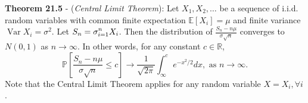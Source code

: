\documentclass{article}
\theoremstyle{definition}
\DeclareMathOperator{\Var}{Var}
\begin{document}
\textbf{Theorem 21.5} - (\textit{Central Limit Theorem}): Let $X_1, X_2, \dots$ be a sequence of i.i.d. random variables with common finite expectation $\mathbb{E}[X_i] = \mu$ and finite variance $\Var{X_i} = \sigma^2$. Let $S_n = \mathlarger{\sigma_{i = 1}^n} X_i$. Then the distribution of $\frac{S_n - n \mu}{\sigma \sqrt{n}}$ converges to $N(0, 1)$ as $n \rightarrow \infty$. In other words, for any constant $c \in \mathbb{R}$, $$\mathbb{P} \left[ \frac{S_n - n \mu}{\sigma \sqrt{n}} \leq c \right] \rightarrow \frac{1}{\sqrt{2 \pi}} \int_\infty^c e^{-x^2/2}dx, \text{ as } n \rightarrow \infty.$$
Note that the Central Limit Theorem applies for any random variable $X = X_i, \forall i$.
\end{document}
